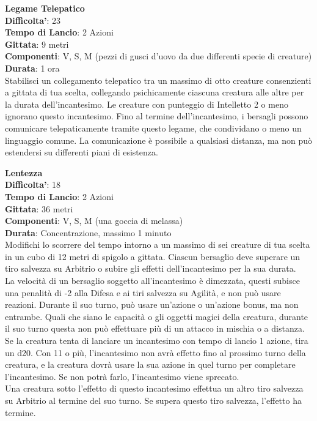 \begin{multicols}{2}
\medskip\textbf{Legame Telepatico}\\
\textbf{Difficolta'}: 23\\
\textbf{Tempo di Lancio}: 2 Azioni\\
\textbf{Gittata}: 9 metri\\
\textbf{Componenti}: V, S, M (pezzi di gusci d’uovo da due differenti specie di creature)\\
\textbf{Durata}: 1 ora\\
Stabilisci un collegamento telepatico tra un massimo di otto creature consenzienti a gittata di tua scelta, collegando psichicamente ciascuna creatura alle altre per la durata dell’incantesimo. Le creature con punteggio di Intelletto 2 o meno ignorano questo incantesimo. Fino al termine dell’incantesimo, i bersagli possono comunicare telepaticamente tramite questo legame, che condividano o meno un linguaggio comune. La comunicazione è possibile a qualsiasi distanza, ma non può estendersi su differenti piani di esistenza.

\medskip\textbf{Lentezza}\\
\textbf{Difficolta'}: 18\\
\textbf{Tempo di Lancio}: 2 Azioni\\
\textbf{Gittata}: 36 metri\\
\textbf{Componenti}: V, S, M (una goccia di melassa) \\
\textbf{Durata}: Concentrazione, massimo 1 minuto\\
Modifichi lo scorrere del tempo intorno a un massimo di sei creature di tua scelta in un cubo di 12 metri di spigolo a gittata. Ciascun bersaglio deve superare un tiro salvezza su Arbitrio o subire gli effetti dell’incantesimo per la sua durata.\\
La velocità di un bersaglio soggetto all’incantesimo è dimezzata, questi subisce una penalità di -2 alla Difesa e ai tiri salvezza su Agilità, e non può usare reazioni. Durante il suo turno, può usare un’azione o un’azione bonus, ma non entrambe. Quali che siano le capacità o gli oggetti magici della creatura, durante il suo turno questa non può effettuare più di un attacco in mischia o a distanza.\\
Se la creatura tenta di lanciare un incantesimo con tempo di lancio 1 azione, tira un d20. Con 11 o più, l’incantesimo non avrà effetto fino al prossimo turno della creatura, e la creatura dovrà usare la sua azione in quel turno per completare l’incantesimo. Se non potrà farlo, l’incantesimo viene sprecato.\\
Una creatura sotto l’effetto di questo incantesimo effettua un altro tiro salvezza su Arbitrio al termine del suo turno. Se supera questo tiro salvezza, l’effetto ha termine.\\


\end{multicols}
